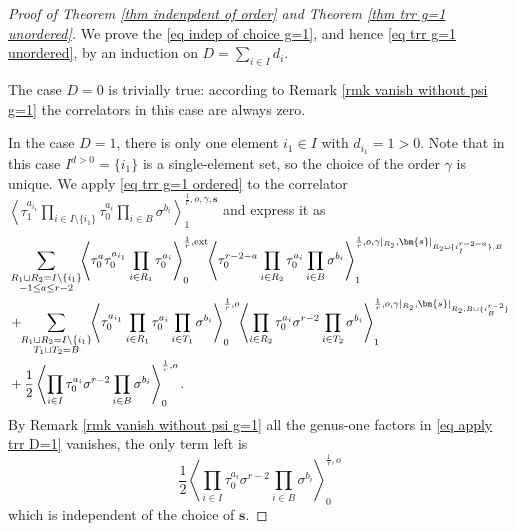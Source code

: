 \documentclass[11pt]{amsart}
\theoremstyle{definition}
\theoremstyle{remark}
\newcommand{\consta}{{\frac{1}{2}}}
\newcommand{\<}{\left<}
\renewcommand{\>}{\right>}
\numberwithin{equation}{section}
\begin{document}
\begin{proof}[Proof of Theorem \ref{thm indenpdent of order} and Theorem \ref{thm trr g=1 unordered}]
    We prove the \eqref{eq indep of choice g=1}, and hence \eqref{eq trr g=1 unordered}, by an induction on $D=\sum_{i\in I} d_i$.

    The case $D=0$ is trivially true: according to Remark \ref{rmk vanish without psi g=1} the correlators in this case are always zero.

    In the case $D=1$, there is only one element $i_1\in I$ with $d_{i_1}=1>0$. Note that in this case $I^{d>0}=\{i_1\}$ is a single-element set, so the choice of the order $\gamma$ is unique. We apply \eqref{eq trr g=1 ordered}  to the correlator $\left\langle \tau_{1}^{a_{i_1}}\prod_{i\in I\setminus \{i_1\}}\tau^{a_i}_{0}\prod_{i\in B}\sigma^{b_i}\right\rangle^{\frac{1}{r},o,\gamma,\bm{s}}_1$ and express it %
as 
    \begin{equation}\label{eq apply trr D=1}
        \begin{split}
    &\sum_{\substack{R_1 \sqcup R_2 = I\setminus\{i_1\}\\ -1\le a \le r-2}}\hspace{-0.1cm}\left\langle \tau_0^{a}\tau_{0}^{a_{i_1}}\prod_{i \in R_1}\tau_{0}^{a_i}\right\rangle^{\frac{1}{r},\text{ext}}_0
    \hspace{-0.1cm}\left\langle \tau_0^{r-2-a}\prod_{i\in R_2}\tau^{a_i}_{0}\prod_{i\in B}\sigma^{b_i}\right\rangle^{\frac{1}{r},o,\gamma\vert_{R_2},\bm{s}\vert_{R_2\sqcup\{i^{r-2-a}_I\},B}}_1\\
    &+\hspace{-0.1cm}\sum_{\substack{R_1 \sqcup R_2 =  I\setminus\{i_1\} \\ T_1 \sqcup T_2 =  B}} \hspace{-0.1cm} \left\langle \tau^{a_{i_1}}_{0}\prod_{i \in R_1} \tau^{a_i}_{0}\prod_{i\in T_1}\sigma^{b_i}\right\rangle^{\frac{1}{r},o}_0 \hspace{-0.1cm}\left\langle \prod_{i \in R_2} \tau^{a_i}_{0} \sigma^{r-2}\prod_{i\in T_2}\sigma^{b_i}\right\rangle^{\frac{1}{r}, o,\gamma\vert_{R_2},\bm{s}\vert_{R_2,B\sqcup\{i^{r-2}_B\}}}_1\\
    &+\consta\left\langle \prod_{i\in I}\tau^{a_i}_{0}\sigma^{r-2}\prod_{i\in B}\sigma^{b_i}\right\rangle^{\frac{1}{r},o}_0.
    \end{split}
    \end{equation}
    By %
Remark \ref{rmk vanish without psi g=1} all the genus-one factors in \eqref{eq apply trr D=1} vanishes, the only term left is 
    $$
    \consta\left\langle \prod_{i\in I}\tau^{a_i}_{0}\sigma^{r-2}\prod_{i\in B}\sigma^{b_i}\right\rangle^{\frac{1}{r},o}_0
    $$
    which is independent of the choice of $\bm{s}$.



\end{proof}
\end{document}
